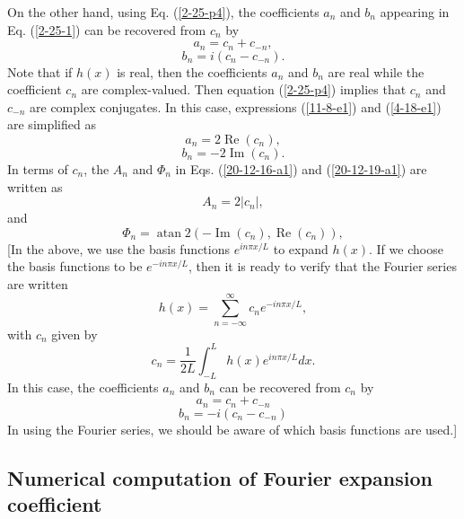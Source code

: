 \documentclass{article}
\newcommand{\tmop}[1]{\ensuremath{\operatorname{#1}}}
\begin{document}
On the other hand, using Eq. (\ref{2-25-p4}), the coefficients $a_n$ and $b_n$
appearing in Eq. (\ref{2-25-1}) can be recovered from $c_n$ by
\begin{equation}
  \label{11-8-e1} a_n = c_n + c_{- n},
\end{equation}
\begin{equation}
  \label{4-18-e1} b_n = i (c_n - c_{- n}) .
\end{equation}
Note that if $h (x)$ is real, then the coefficients $a_n$ and $b_n$ are real
while the coefficient $c_n$ are complex-valued. Then equation (\ref{2-25-p4})
implies that $c_n$ and $c_{- n}$ are complex conjugates. In this case,
expressions (\ref{11-8-e1}) and (\ref{4-18-e1}) are simplified as
\begin{equation}
  a_n = 2 \tmop{Re} (c_n),
\end{equation}
\begin{equation}
  b_n = - 2 \tmop{Im} (c_n) .
\end{equation}
In terms of $c_n$, the $A_n$ and $\Phi_n$ in Eqs. (\ref{20-12-16-a1}) and
(\ref{20-12-19-a1}) are written as
\begin{equation}
  A_n = 2 | c_n |,
\end{equation}
and
\begin{equation}
  \Phi_n = \tmop{atan} 2 (- \tmop{Im} (c_n), \tmop{Re} (c_n)),
\end{equation}
[In the above, we use the basis functions $e^{i n \pi x / L}$ to expand $h
(x)$. If we choose the basis functions to be $e^{- i n \pi x / L}$, then it is
ready to verify that the Fourier series are written
\begin{equation}
  h (x) = \sum_{n = - \infty}^{\infty} c_n e^{- i n \pi x / L},
\end{equation}
with $c_n$ given by
\begin{equation}
  \label{19-1-10-1} c_n = \frac{1}{2 L} \int_{- L}^L h (x) e^{i n \pi x / L} d
  x.
\end{equation}
In this case, the coefficients $a_n$ and $b_n$ can be recovered from $c_n$ by
\begin{equation}
  \label{18-2-2p1} a_n = c_n + c_{- n}
\end{equation}
\begin{equation}
  \label{18-2-2p2} b_n = - i (c_n - c_{- n})
\end{equation}
In using the Fourier series, we should be aware of which basis functions are
used.]

\subsection{Numerical computation of Fourier expansion coefficient}
\end{document}
